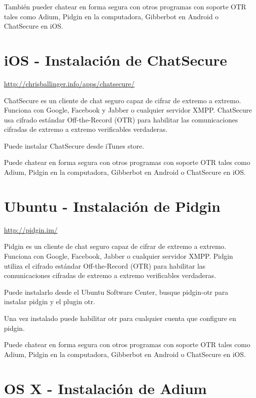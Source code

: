 \documentclass[10pt,a5paper,twoside,,]{book}
\begin{document}
También pueder chatear en forma segura con otros programas con soporte
OTR tales como Adium, Pidgin en la computadora, Gibberbot en Android o
ChatSecure en iOS.

\section{iOS - Instalación de
ChatSecure}\label{ios---instalaciuxf3n-de-chatsecure}

\url{http://chrisballinger.info/apps/chatsecure/}

ChatSecure es un cliente de chat seguro capaz de cifrar de extremo a
extremo. Funciona con Google, Facebook y Jabber o cualquier servidor
XMPP. ChatSecure usa cifrado estándar Off-the-Record (OTR) para
habilitar las comunicaciones cifradas de extremo a extremo verificables
verdaderas.

Puede instalar ChatSecure desde iTunes store.

Puede chatear en forma segura con otros programas con soporte OTR tales
como Adium, Pidgin en la computadora, Gibberbot en Android o ChatSecure
en iOS.

\section{Ubuntu - Instalación de
Pidgin}\label{ubuntu---instalaciuxf3n-de-pidgin}

\url{http://pidgin.im/}

Pidgin es un cliente de chat seguro capaz de cifrar de extremo a
extremo. Funciona con Google, Facebook, Jabber o cualquier servidor
XMPP. Pidgin utiliza el cifrado estándar Off-the-Record (OTR) para
habilitar las comunicaciones cifradas de extremo a extremo verificables
verdaderas.

Puede instalarlo desde el Ubuntu Software Center, busque pidgin-otr para
instalar pidgin y el plugin otr.

Una vez instalado puede habilitar otr para cualquier cuenta que
configure en pidgin.

Puede chatear en forma segura con otros programas con soporte OTR tales
como Adium, Pidgin en la computadora, Gibberbot en Android o ChatSecure
en iOS.

\section{OS X - Instalación de
Adium}\label{os-x---instalaciuxf3n-de-adium}
\end{document}
